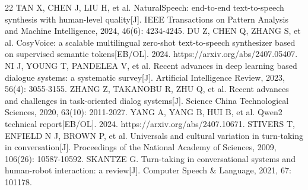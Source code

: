 \documentclass[UTF8,a4paper,zihao=5]{ctexart}
\begin{document}
\begin{thebibliography}{22}
 TAN X, CHEN J, LIU H, et al. NaturalSpeech: end-to-end text-to-speech synthesis with human-level quality[J]. IEEE Transactions on Pattern Analysis and Machine Intelligence, 2024, 46(6): 4234-4245.
 DU Z, CHEN Q, ZHANG S, et al. CosyVoice: a scalable multilingual zero-shot text-to-speech synthesizer based on supervised semantic tokens[EB/OL]. 2024. https://arxiv.org/abs/2407.05407.
 NI J, YOUNG T, PANDELEA V, et al. Recent advances in deep learning based dialogue systems: a systematic survey[J]. Artificial Intelligence Review, 2023, 56(4): 3055-3155.
 ZHANG Z, TAKANOBU R, ZHU Q, et al. Recent advances and challenges in task-oriented dialog systems[J]. Science China Technological Sciences, 2020, 63(10): 2011-2027.
 YANG A, YANG B, HUI B, et al. Qwen2 technical report[EB/OL]. 2024. https://arxiv.org/abs/2407.10671.
 STIVERS T, ENFIELD N J, BROWN P, et al. Universals and cultural variation in turn-taking in conversation[J]. Proceedings of the National Academy of Sciences, 2009, 106(26): 10587-10592.
 SKANTZE G. Turn-taking in conversational systems and human-robot interaction: a review[J]. Computer Speech \& Language, 2021, 67: 101178.
\end{thebibliography}
\end{document}
